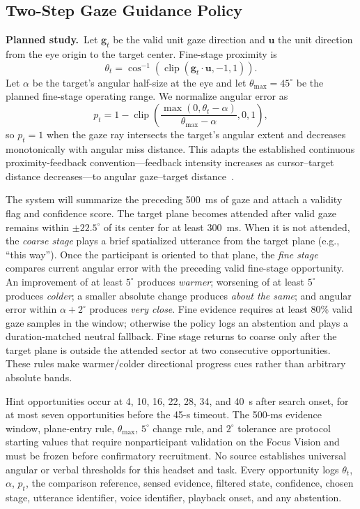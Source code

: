 \documentclass[10pt,journal,compsoc]{IEEEtran}
\newcommand{\planned}{\textbf{Planned study.}\ }
\begin{document}
\subsection{Two-Step Gaze Guidance Policy}
\planned Let $\mathbf{g}_t$ be the valid unit gaze direction and $\mathbf{u}$ the unit direction from the eye origin to the target center. Fine-stage proximity is
\begin{equation}
  \theta_t=\cos^{-1}\!\left(\operatorname{clip}(\mathbf{g}_t\cdot\mathbf{u},-1,1)\right).
\end{equation}
Let $\alpha$ be the target's angular half-size at the eye and let $\theta_{\max}=45^\circ$ be the planned fine-stage operating range. We normalize angular error as
\begin{equation}
  p_t=1-\operatorname{clip}\!\left(\frac{\max(0,\theta_t-\alpha)}{\theta_{\max}-\alpha},0,1\right),
\end{equation}
so $p_t=1$ when the gaze ray intersects the target's angular extent and decreases monotonically with angular miss distance. This adapts the established continuous proximity-feedback convention---feedback intensity increases as cursor--target distance decreases---to angular gaze--target distance~\cite{ariza2018proximity}.

The system will summarize the preceding 500~ms of gaze and attach a validity flag and confidence score. The target plane becomes attended after valid gaze remains within $\pm22.5^\circ$ of its center for at least 300~ms. When it is not attended, the \emph{coarse stage} plays a brief spatialized utterance from the target plane (e.g., ``this way''). Once the participant is oriented to that plane, the \emph{fine stage} compares current angular error with the preceding valid fine-stage opportunity. An improvement of at least $5^\circ$ produces \emph{warmer}; worsening of at least $5^\circ$ produces \emph{colder}; a smaller absolute change produces \emph{about the same}; and angular error within $\alpha+2^\circ$ produces \emph{very close}. Fine evidence requires at least 80\% valid gaze samples in the window; otherwise the policy logs an abstention and plays a duration-matched neutral fallback. Fine stage returns to coarse only after the target plane is outside the attended sector at two consecutive opportunities. These rules make warmer/colder directional progress cues rather than arbitrary absolute bands.

Hint opportunities occur at 4, 10, 16, 22, 28, 34, and 40~s after search onset, for at most seven opportunities before the 45-s timeout. The 500-ms evidence window, plane-entry rule, $\theta_{\max}$, $5^\circ$ change rule, and $2^\circ$ tolerance are protocol starting values that require nonparticipant validation on the Focus Vision and must be frozen before confirmatory recruitment. No source establishes universal angular or verbal thresholds for this headset and task. Every opportunity logs $\theta_t$, $\alpha$, $p_t$, the comparison reference, sensed evidence, filtered state, confidence, chosen stage, utterance identifier, voice identifier, playback onset, and any abstention.
\end{document}

